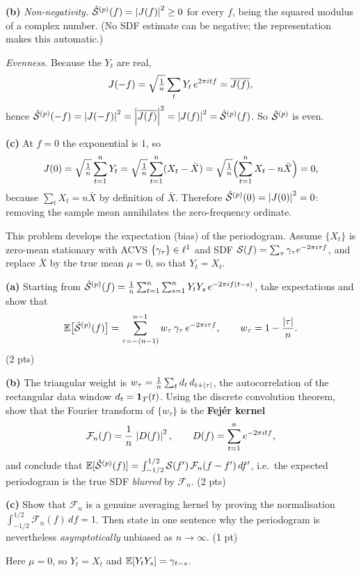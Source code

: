 \documentclass[11pt]{article}
\begin{document}
\textbf{(b)} \emph{Non-negativity.} $\hat{\mathcal{S}}^{(p)}(f)=\left\lvert J(f) \right\rvert^2\ge0$ for every $f$, being the squared modulus of a complex number. (No SDF estimate can be negative; the representation makes this automatic.)

\emph{Evenness.} Because the $Y_t$ are real,
\[
J(-f)=\sqrt{\tfrac1n}\sum_t Y_t\,e^{2\pi i t f}=\overline{J(f)},
\]
hence $\hat{\mathcal{S}}^{(p)}(-f)=\left\lvert J(-f) \right\rvert^2=\left\lvert \overline{J(f)} \right\rvert^2=\left\lvert J(f) \right\rvert^2=\hat{\mathcal{S}}^{(p)}(f)$. So $\hat{\mathcal{S}}^{(p)}$ is even.

\textbf{(c)} At $f=0$ the exponential is $1$, so
\[
J(0)=\sqrt{\tfrac1n}\sum_{t=1}^{n} Y_t=\sqrt{\tfrac1n}\sum_{t=1}^{n}(X_t-\bar X)
=\sqrt{\tfrac1n}\Bigl(\sum_{t=1}^n X_t-n\bar X\Bigr)=0,
\]
because $\sum_t X_t=n\bar X$ by definition of $\bar X$. Therefore $\hat{\mathcal{S}}^{(p)}(0)=\left\lvert J(0) \right\rvert^2=0$: removing the sample mean annihilates the zero-frequency ordinate.

\statementstart
This problem develops the expectation (bias) of the periodogram. Assume $\{X_t\}$ is zero-mean stationary with ACVS $\{\gamma_\tau\}\in\ell^1$ and SDF $\mathcal{S}(f)=\sum_\tau\gamma_\tau e^{-2\pi i\tau f}$, and replace $\bar X$ by the true mean $\mu=0$, so that $Y_t=X_t$.

\textbf{(a)} Starting from $\hat{\mathcal{S}}^{(p)}(f)=\frac1n\sum_{t=1}^{n}\sum_{s=1}^{n} Y_tY_s\,e^{-2\pi i f(t-s)}$, take expectations and show that
\[
\mathbb{E}\bigl[\hat{\mathcal{S}}^{(p)}(f)\bigr]=\sum_{\tau=-(n-1)}^{n-1} w_\tau\,\gamma_\tau\,e^{-2\pi i\tau f},
\qquad
w_\tau=1-\frac{\left\lvert \tau \right\rvert}{n}.
\]
\hfill(2 pts)

\textbf{(b)} The triangular weight is $w_\tau=\frac1n\sum_{t} d_t\,d_{t+\left\lvert \tau \right\rvert}$, the autocorrelation of the rectangular data window $d_t=\mathbf{1}_T(t)$. Using the discrete convolution theorem, show that the Fourier transform of $\{w_\tau\}$ is the \textbf{Fej\'er kernel}
\[
\mathcal F_n(f)=\frac1n\,\left\lvert D(f) \right\rvert^2,\qquad D(f)=\sum_{t=1}^{n} e^{-2\pi i t f},
\]
and conclude that $\mathbb{E}[\hat{\mathcal{S}}^{(p)}(f)]=\int_{-1/2}^{1/2}\mathcal{S}(f')\,\mathcal F_n(f-f')\,df'$, i.e.\ the expected periodogram is the true SDF \emph{blurred} by $\mathcal F_n$. \hfill(2 pts)

\textbf{(c)} Show that $\mathcal F_n$ is a genuine averaging kernel by proving the normalisation $\int_{-1/2}^{1/2}\mathcal F_n(f)\,df=1$. Then state in one sentence why the periodogram is nevertheless \emph{asymptotically} unbiased as $n\to\infty$. \hfill(1 pt)
\statementend

Here $\mu=0$, so $Y_t=X_t$ and $\mathbb{E}[Y_tY_s]=\gamma_{t-s}$.
\end{document}
